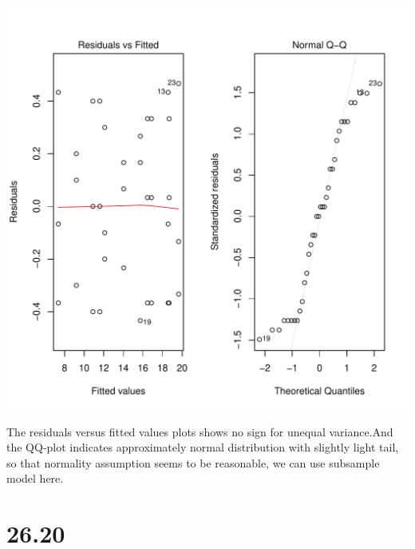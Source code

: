 \documentclass{article}\usepackage[]{graphicx}\usepackage[]{color}
\makeatletter
\def\maxwidth{ %
  \ifdim\Gin@nat@width>\linewidth
    \linewidth
  \else
    \Gin@nat@width
  \fi
}
\newenvironment{kframe}{%
 \def\at@end@of@kframe{}%
 \ifinner\ifhmode%
  \def\at@end@of@kframe{\end{minipage}}%
  \begin{minipage}{\columnwidth}%
 \fi\fi%
 \def\FrameCommand##1{\hskip\@totalleftmargin \hskip-\fboxsep
 \colorbox{shadecolor}{##1}\hskip-\fboxsep
     \hskip-\linewidth \hskip-\@totalleftmargin \hskip\columnwidth}%
 \MakeFramed {\advance\hsize-\width
   \@totalleftmargin\z@ \linewidth\hsize
   \@setminipage}}%
 {\par\unskip\endMakeFramed%
 \at@end@of@kframe}
\newenvironment{knitrout}{}{} %
\makeatother
\begin{document}
\begin{knitrout}
\begin{kframe}
\end{kframe}
\includegraphics[width=\maxwidth]{figure/unnamed-chunk-13-1} 

\end{knitrout}

\qquad The residuals versus fitted values plots shows no sign for unequal variance.And the QQ-plot indicates approximately normal distribution with slightly light tail, so that normality assumption seems to be reasonable, we can use subsample model here.

\section{26.20}
\end{document}
